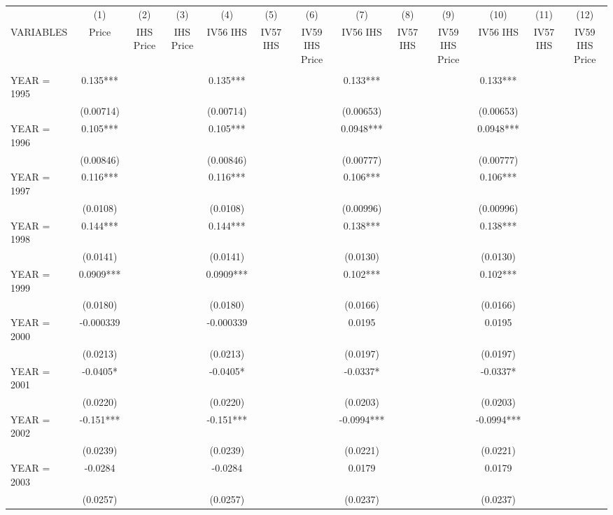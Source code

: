 \begin{tabular}{lcccccccccccc} \hline
 & (1) & (2) & (3) & (4) & (5) & (6) & (7) & (8) & (9) & (10) & (11) & (12) \\
VARIABLES & Price & IHS Price & IHS Price & IV56 IHS & IV57 IHS & IV59 IHS Price & IV56 IHS & IV57 IHS & IV59 IHS Price & IV56 IHS & IV57 IHS & IV59 IHS Price \\ \hline
 &  &  &  &  &  &  &  &  &  &  &  &  \\
YEAR = 1995 & 0.135*** &  &  & 0.135*** &  &  & 0.133*** &  &  & 0.133*** &  &  \\
 & (0.00714) &  &  & (0.00714) &  &  & (0.00653) &  &  & (0.00653) &  &  \\
YEAR = 1996 & 0.105*** &  &  & 0.105*** &  &  & 0.0948*** &  &  & 0.0948*** &  &  \\
 & (0.00846) &  &  & (0.00846) &  &  & (0.00777) &  &  & (0.00777) &  &  \\
YEAR = 1997 & 0.116*** &  &  & 0.116*** &  &  & 0.106*** &  &  & 0.106*** &  &  \\
 & (0.0108) &  &  & (0.0108) &  &  & (0.00996) &  &  & (0.00996) &  &  \\
YEAR = 1998 & 0.144*** &  &  & 0.144*** &  &  & 0.138*** &  &  & 0.138*** &  &  \\
 & (0.0141) &  &  & (0.0141) &  &  & (0.0130) &  &  & (0.0130) &  &  \\
YEAR = 1999 & 0.0909*** &  &  & 0.0909*** &  &  & 0.102*** &  &  & 0.102*** &  &  \\
 & (0.0180) &  &  & (0.0180) &  &  & (0.0166) &  &  & (0.0166) &  &  \\
YEAR = 2000 & -0.000339 &  &  & -0.000339 &  &  & 0.0195 &  &  & 0.0195 &  &  \\
 & (0.0213) &  &  & (0.0213) &  &  & (0.0197) &  &  & (0.0197) &  &  \\
YEAR = 2001 & -0.0405* &  &  & -0.0405* &  &  & -0.0337* &  &  & -0.0337* &  &  \\
 & (0.0220) &  &  & (0.0220) &  &  & (0.0203) &  &  & (0.0203) &  &  \\
YEAR = 2002 & -0.151*** &  &  & -0.151*** &  &  & -0.0994*** &  &  & -0.0994*** &  &  \\
 & (0.0239) &  &  & (0.0239) &  &  & (0.0221) &  &  & (0.0221) &  &  \\
YEAR = 2003 & -0.0284 &  &  & -0.0284 &  &  & 0.0179 &  &  & 0.0179 &  &  \\
 & (0.0257) &  &  & (0.0257) &  &  & (0.0237) &  &  & (0.0237) &  &  \\

\end{tabular}
